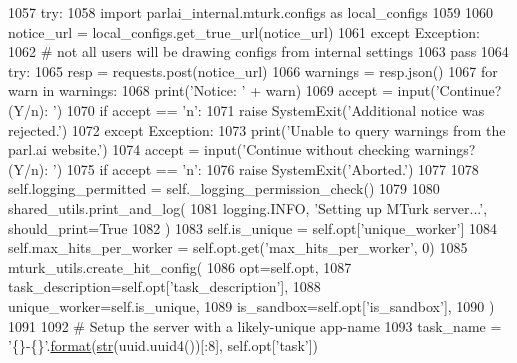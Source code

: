 \begin{DoxyCode}
{{{1057             \textcolor{keywordflow}{try}:
1058                 \textcolor{keyword}{import} parlai\_internal.mturk.configs \textcolor{keyword}{as} local\_configs
1059 
1060                 notice\_url = local\_configs.get\_true\_url(notice\_url)
1061             \textcolor{keywordflow}{except} Exception:
1062                 \textcolor{comment}{# not all users will be drawing configs from internal settings}
1063                 \textcolor{keywordflow}{pass}
1064             \textcolor{keywordflow}{try}:
1065                 resp = requests.post(notice\_url)
1066                 warnings = resp.json()
1067                 \textcolor{keywordflow}{for} warn \textcolor{keywordflow}{in} warnings:
1068                     print(\textcolor{stringliteral}{'Notice: '} + warn)
1069                     accept = input(\textcolor{stringliteral}{'Continue? (Y/n): '})
1070                     \textcolor{keywordflow}{if} accept == \textcolor{stringliteral}{'n'}:
1071                         \textcolor{keywordflow}{raise} SystemExit(\textcolor{stringliteral}{'Additional notice was rejected.'})
1072             \textcolor{keywordflow}{except} Exception:
1073                 print(\textcolor{stringliteral}{'Unable to query warnings from the parl.ai website.'})
1074                 accept = input(\textcolor{stringliteral}{'Continue without checking warnings? (Y/n): '})
1075                 \textcolor{keywordflow}{if} accept == \textcolor{stringliteral}{'n'}:
1076                     \textcolor{keywordflow}{raise} SystemExit(\textcolor{stringliteral}{'Aborted.'})
1077 
1078         self.logging\_permitted = self.\_logging\_permission\_check()
1079 
1080         shared\_utils.print\_and\_log(
1081             logging.INFO, \textcolor{stringliteral}{'Setting up MTurk server...'}, should\_print=\textcolor{keyword}{True}
1082         )
1083         self.is\_unique = self.opt[\textcolor{stringliteral}{'unique\_worker'}]
1084         self.max\_hits\_per\_worker = self.opt.get(\textcolor{stringliteral}{'max\_hits\_per\_worker'}, 0)
1085         mturk\_utils.create\_hit\_config(
1086             opt=self.opt,
1087             task\_description=self.opt[\textcolor{stringliteral}{'task\_description'}],
1088             unique\_worker=self.is\_unique,
1089             is\_sandbox=self.opt[\textcolor{stringliteral}{'is\_sandbox'}],
1090         )
1091 
1092         \textcolor{comment}{# Setup the server with a likely-unique app-name}
1093         task\_name = \textcolor{stringliteral}{'\{\}-\{\}'}.\hyperlink{namespaceparlai_1_1chat__service_1_1services_1_1messenger_1_1shared__utils_a32e2e2022b824fbaf80c747160b52a76}{format}(\hyperlink{namespacegenerate__task__READMEs_a5b88452ffb87b78c8c85ececebafc09f}{str}(uuid.uuid4())[:8], self.opt[\textcolor{stringliteral}{'task'}])
}}}
\end{DoxyCode}

